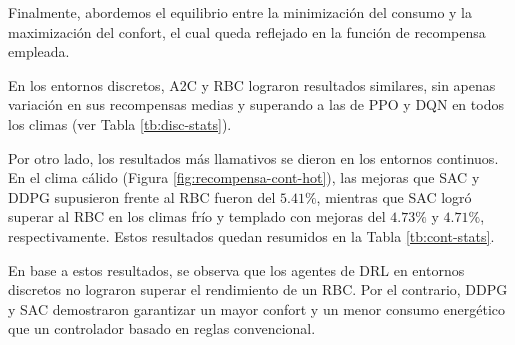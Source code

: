Finalmente, abordemos el equilibrio entre la minimización del consumo y la maximización del confort, el cual queda reflejado en la función de recompensa empleada. 

En los entornos discretos, A2C y RBC lograron resultados similares, sin apenas variación en sus recompensas medias y superando a las de PPO y DQN en todos los climas (ver Tabla \ref{tb:disc-stats}).

Por otro lado, los resultados más llamativos se dieron en los entornos continuos. En el clima cálido (Figura \ref{fig:recompensa-cont-hot}), las mejoras que SAC y DDPG supusieron frente al RBC fueron del $5.41\%$, mientras que SAC logró superar al RBC en los climas frío y templado con mejoras del $4.73\%$ y $4.71\%$, respectivamente. Estos resultados quedan resumidos en la Tabla \ref{tb:cont-stats}.

En base a estos resultados, se observa que los agentes de DRL en entornos discretos no lograron superar el rendimiento de un RBC. Por el contrario, DDPG y SAC demostraron garantizar un mayor confort y un menor consumo energético que un controlador basado en reglas convencional.

\begin{table}
    \centering
    \caption{Recompensas medias obtenidas por los agentes entrenados en entornos discretos a lo largo de 20 episodios de validación}
    \label{tb:disc-stats}
\end{table}

